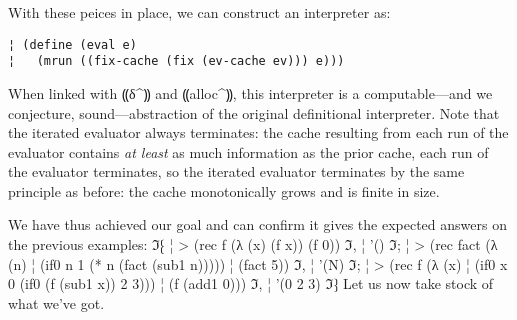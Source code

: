 With these peices in place, we can construct an interpreter as:
\begin{lstlisting}
¦ (define (eval e)
¦   (mrun ((fix-cache (fix (ev-cache ev))) e)))
\end{lstlisting}
When linked with ⸨δ^⸩ and ⸨alloc^⸩, this interpreter is
a computable---and we conjecture, sound---abstraction of the original
definitional interpreter.  Note that the iterated evaluator always
terminates: the cache resulting from each run of the evaluator
contains \emph{at least} as much information as the prior cache, each
run of the evaluator terminates, so the iterated evaluator terminates
by the same principle as before: the cache monotonically grows and is
finite in size.

We have thus achieved our goal and can confirm it gives
the expected answers on the previous examples:
ℑ⁅
¦ > (rec f (λ (x) (f x)) (f 0))
ℑ,
¦ '()
ℑ;
¦ > (rec fact (λ (n)
¦              (if0 n 1 (* n (fact (sub1 n)))))
¦     (fact 5))
ℑ,
¦ '(N)
ℑ;
¦ > (rec f (λ (x) 
¦            (if0 x 0 (if0 (f (sub1 x)) 2 3)))
¦      (f (add1 0)))
ℑ,
¦ '(0 2 3)
ℑ⁆
Let us now take stock of what we've got.
